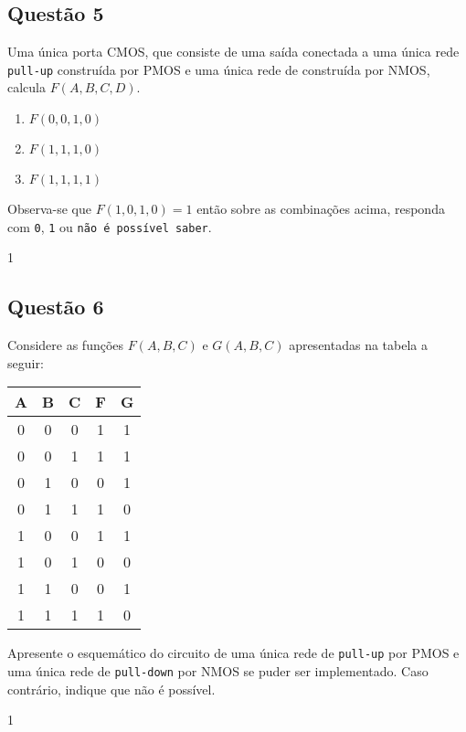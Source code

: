 \documentclass{article}
\begin{document}
\newpage
        \subsection{Questão 5}
            \begin{exercise}
                Uma única porta CMOS, que consiste de uma saída conectada a uma única rede \texttt{pull-up} construída por PMOS e uma única rede de  construída por NMOS, calcula $F(A,B,C,D)$.
                    \begin{enumerate}[noitemsep]
                        \item $F(0,0,1,0)$
                        \item $F(1,1,1,0)$
                        \item $F(1,1,1,1)$
                    \end{enumerate}
                Observa-se que $F(1,0,1,0)=1$ então sobre as combinações acima, responda com \texttt{0}, \texttt{1} ou \texttt{não é possível saber}.
            \end{exercise}
            \begin{resolution}
                1
            \end{resolution}

\newpage
        \subsection{Questão 6}
            \begin{exercise}
                Considere as funções $F(A,B,C)$ e $G(A,B,C)$ apresentadas na tabela a seguir:
                    \begin{table}[H]
                        \centering  
                        \begin{tabular}[]{ccc|cc}\hline
                            A & B & C & F & G\\\hline
                            0 & 0 & 0 & 1 & 1\\
                            0 & 0 & 1 & 1 & 1\\
                            0 & 1 & 0 & 0 & 1\\
                            0 & 1 & 1 & 1 & 0\\
                            1 & 0 & 0 & 1 & 1\\
                            1 & 0 & 1 & 0 & 0\\
                            1 & 1 & 0 & 0 & 1\\
                            1 & 1 & 1 & 1 & 0\\\hline
                        \end{tabular}
                    \end{table}
                Apresente o esquemático do circuito de uma única rede de \texttt{pull-up} por PMOS e uma única rede de \texttt{pull-down} por NMOS se puder ser implementado. Caso contrário, indique que não é possível.
            \end{exercise}
            \begin{resolution}
                1
            \end{resolution}
\end{document}
